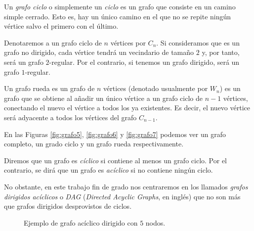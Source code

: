 \begin{definition}
Un \emph{grafo ciclo} o simplemente un \emph{ciclo} es un grafo que consiste en un camino simple cerrado. Esto es, hay un único camino en el que no se repite ningún vértice salvo el primero con el último.

Denotaremos a un grafo ciclo de $n$ vértices por $C_n$. Si consideramos que es un grafo no dirigido, cada vértice tendrá un vecindario de tamaño $2$ y, por tanto, será un grafo $2$-regular. Por el contrario, si tenemos un grafo dirigido, será un grafo $1$-regular.
\end{definition}

\begin{definition}
Un grafo rueda es un grafo de $n$ vértices (denotado usualmente por $W_n$) es un grafo que se obtiene al añadir un único vértice a un grafo ciclo de $n-1$ vértices, conectando el nuevo el vértice a todos los ya existentes. Es decir, el nuevo vértice será adyacente a todos los vértices del grafo $C_{n-1}$.
\end{definition}

\begin{exampleth}
En las Figuras \ref{fig:grafo5}, \ref{fig:grafo6} y \ref{fig:grafo7} podemos ver un grafo completo, un grado ciclo y un grafo rueda respectivamente.
\end{exampleth}

\begin{definition}
Diremos que un grafo es \emph{cíclico} si contiene al menos un grafo ciclo. Por el contrario, se dirá que un grafo es \emph{acíclico} si no contiene ningún ciclo.

No obstante, en este trabajo fin de grado nos centraremos en los llamados \emph{grafos dirigidos acíclicos} o \emph{DAG} (\emph{Directed Acyclic Graphs}, en inglés) que no son más que grafos dirigidos desprovistos de ciclos.
\end{definition}

\begin{wrapfigure}{l}{0.4\textwidth}
\centering
{}
\caption{Ejemplo de grafo acíclico dirigido con $5$ nodos.}
\label{fig:grafo8}
\end{wrapfigure}

